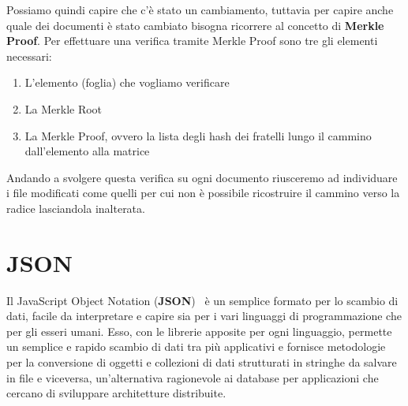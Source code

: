 Possiamo quindi capire che c’è stato un cambiamento, tuttavia per capire anche
quale dei documenti è stato cambiato bisogna ricorrere al concetto di \textbf{Merkle Proof}.
Per effettuare una verifica tramite Merkle Proof sono tre gli elementi necessari:
\begin{enumerate}
    \item L’elemento (foglia) che vogliamo verificare
    \item La Merkle Root
    \item La Merkle Proof, ovvero la lista degli hash dei fratelli lungo il cammino dall’elemento alla matrice
\end{enumerate}
Andando a svolgere questa verifica su ogni documento riusceremo ad individuare i file modificati come
quelli per cui non è possibile ricostruire il cammino verso la radice lasciandola inalterata.

\section{JSON}
\label{sub:json}
Il JavaScript Object Notation (\textbf{JSON})~\cite{json} è un semplice formato per lo scambio di dati,
facile da interpretare e capire sia per i vari linguaggi di programmazione che per gli esseri umani.
Esso, con le librerie apposite per ogni linguaggio, permette un semplice e rapido scambio
di dati tra più applicativi e fornisce metodologie per la conversione di oggetti e collezioni
di dati strutturati in stringhe da salvare in file e viceversa, un’alternativa ragionevole ai database
per applicazioni che cercano di sviluppare architetture distribuite.

